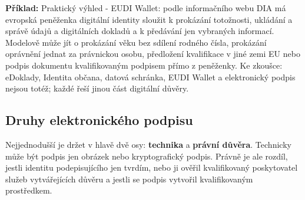\documentclass[11pt,a4paper]{article}
\newcommand{\priklad}[1]{\begin{tcolorbox}[breakable,enhanced,colback=green!7,colframe=green!30!black,boxrule=0pt,arc=1mm,left=5pt,right=5pt,top=5pt,bottom=5pt,before skip=6pt,after skip=6pt]\textbf{Příklad:} #1\end{tcolorbox}}
\begin{document}
\priklad{Praktický výhled - EUDI Wallet: podle informačního webu DIA má evropská peněženka digitální identity sloužit k prokázání totožnosti, ukládání a správě údajů a digitálních dokladů a k předávání jen vybraných informací. Modelově může jít o prokázání věku bez sdílení rodného čísla, prokázání oprávnění jednat za právnickou osobu, předložení kvalifikace v jiné zemi EU nebo podpis dokumentu kvalifikovaným podpisem přímo z peněženky. Ke zkoušce: eDoklady, Identita občana, datová schránka, EUDI Wallet a elektronický podpis nejsou totéž; každé řeší jinou část digitální důvěry.}

\subsection*{Druhy elektronického podpisu}
Nejjednodušší je držet v hlavě dvě osy: \textbf{technika} a \textbf{právní důvěra}. Technicky může být podpis jen obrázek nebo kryptografický podpis. Právně je ale rozdíl, jestli identitu podepisujícího jen tvrdím, nebo ji ověřil kvalifikovaný poskytovatel služeb vytvářejících důvěru a jestli se podpis vytvořil kvalifikovaným prostředkem.
\end{document}

